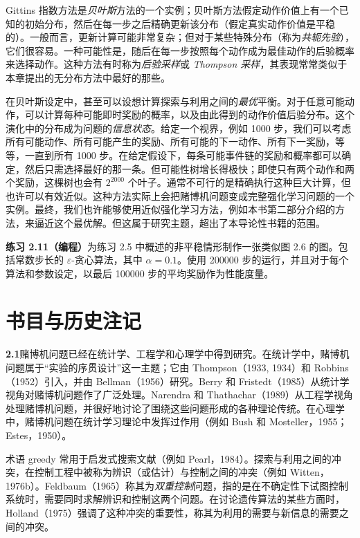 \documentclass[UTF8, 12pt, fontset=fandol, oneside]{ctexart}
\begin{document}
Gittins 指数方法是\emph{贝叶斯}方法的一个实例；贝叶斯方法假定动作价值上有一个已知的初始分布，然后在每一步之后精确更新该分布（假定真实动作价值是平稳的）。一般而言，更新计算可能非常复杂；但对于某些特殊分布（称为\emph{共轭先验}），它们很容易。一种可能性是，随后在每一步按照每个动作成为最佳动作的后验概率来选择动作。这种方法有时称为\emph{后验采样}或 \emph{Thompson 采样}，其表现常常类似于本章提出的无分布方法中最好的那些。

在贝叶斯设定中，甚至可以设想计算探索与利用之间的\emph{最优}平衡。对于任意可能动作，可以计算每种可能即时奖励的概率，以及由此得到的动作价值后验分布。这个演化中的分布成为问题的\emph{信息状态}。给定一个视界，例如 1000 步，我们可以考虑所有可能动作、所有可能产生的奖励、所有可能的下一动作、所有下一奖励，等等，一直到所有 1000 步。在给定假设下，每条可能事件链的奖励和概率都可以确定，然后只需选择最好的那一条。但可能性树增长得极快；即使只有两个动作和两个奖励，这棵树也会有 $2^{2000}$ 个叶子。通常不可行的是精确执行这种巨大计算，但也许可以有效近似。这种方法实际上会把赌博机问题变成完整强化学习问题的一个实例。最终，我们也许能够使用近似强化学习方法，例如本书第二部分介绍的方法，来逼近这个最优解。但这属于研究主题，超出了本导论性书籍的范围。

\noindent\textbf{练习 2.11（编程）}\quad 为练习 2.5 中概述的非平稳情形制作一张类似图 2.6 的图。包括常数步长的 $\varepsilon$-贪心算法，其中 $\alpha=0.1$。使用 200000 步的运行，并且对于每个算法和参数设定，以最后 100000 步的平均奖励作为性能度量。

\section*{书目与历史注记}

\noindent\textbf{2.1}\quad 赌博机问题已经在统计学、工程学和心理学中得到研究。在统计学中，赌博机问题属于“实验的序贯设计”这一主题；它由 Thompson（1933, 1934）和 Robbins（1952）引入，并由 Bellman（1956）研究。Berry 和 Fristedt（1985）从统计学视角对赌博机问题作了广泛处理。Narendra 和 Thathachar（1989）从工程学视角处理赌博机问题，并很好地讨论了围绕这些问题形成的各种理论传统。在心理学中，赌博机问题在统计学习理论中发挥过作用（例如 Bush 和 Mosteller，1955；Estes，1950）。

术语 greedy 常用于启发式搜索文献（例如 Pearl，1984）。探索与利用之间的冲突，在控制工程中被称为辨识（或估计）与控制之间的冲突（例如 Witten，1976b）。Feldbaum（1965）称其为\emph{双重控制}问题，指的是在不确定性下试图控制系统时，需要同时求解辨识和控制这两个问题。在讨论遗传算法的某些方面时，Holland（1975）强调了这种冲突的重要性，称其为利用的需要与新信息的需要之间的冲突。
\end{document}
